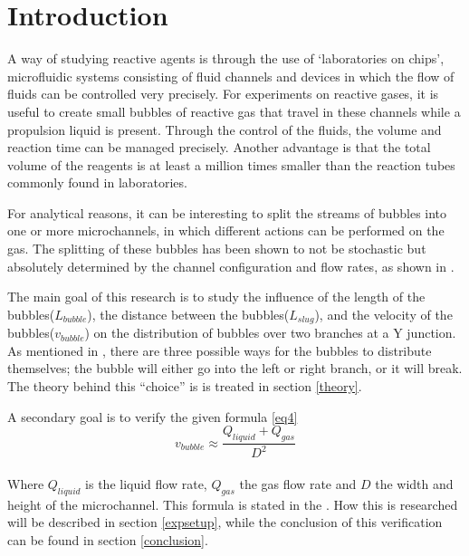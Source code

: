 \section{Introduction}
A way of studying reactive agents is through the use of `laboratories on chips', microfluidic systems consisting of fluid channels and devices in which the flow of fluids can be controlled very precisely. For experiments on reactive gases, it is useful to create small bubbles of reactive gas that travel in these channels while a propulsion liquid is present. Through the control of the fluids, the volume and reaction time can be managed precisely. Another advantage is that the total volume of the reagents is at least a million times smaller than the reaction tubes commonly found in laboratories. 
\par
For analytical reasons, it can be interesting to split the streams of bubbles into one or more microchannels, in which different actions can be performed on the gas. The splitting of these bubbles has been shown to not be stochastic but absolutely determined by the channel configuration and flow rates, as shown in \cite{multiphase}.
\par
The main goal of this research is to study the influence of the length of the bubbles($L_{bubble}$), the distance between the bubbles($L_{slug}$), and the velocity of the bubbles($v_{bubble}$) on the distribution of bubbles over two branches at a Y junction. As mentioned in \cite{bifurcation}, there are three possible ways for the bubbles to distribute themselves; the bubble will either go into the left or right branch, or it will break. The theory behind this ``choice'' is is treated in section \ref{theory}. 
\par
A secondary goal is to verify the given formula \ref{eq4}
\begin{equation}
\label{eq4}
v_{bubble} \approx \frac{Q_{liquid} + Q_{gas}}{D^{2}}
\end{equation}\\
Where $Q_{liquid}$ is the liquid flow rate, $Q_{gas}$ the gas flow rate and $D$ the width and height of the microchannel. This formula is stated in the \cite{handout}. How this is researched will be described in section \ref{expsetup}, while the conclusion of this verification can be found in section \ref{conclusion}. \\